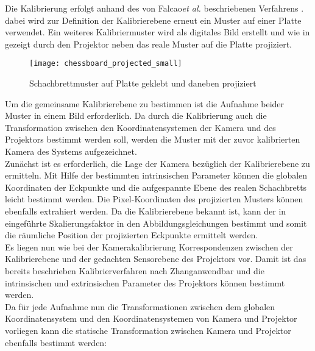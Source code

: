 Die Kalibrierung erfolgt anhand des von Falcao\red[Groß?] \textit{et al.} beschriebenen Verfahrens \cite{Falcao2008}. dabei wird zur Definition der Kalibrierebene erneut ein Muster auf einer Platte verwendet. Ein weiteres Kalibriermuster wird als digitales Bild erstellt und wie in  gezeigt durch den Projektor neben das reale Muster auf die Platte projiziert.

\begin{figure}[ht]
	\begin{center}
		\texttt{[image: chessboard\_projected\_small]}
		\caption{Schachbrettmuster auf Platte geklebt und daneben projiziert}
		\label{fig.projcalib}
	\end{center}
\end{figure}

Um die gemeinsame Kalibrierebene zu bestimmen ist die Aufnahme beider Muster in einem Bild erforderlich. Da durch die Kalibrierung auch die Transformation zwischen den Koordinatensystemen der Kamera und des Projektors bestimmt werden soll, werden die Muster mit der zuvor kalibrierten Kamera des Systems aufgezeichnet.\\
Zunächst ist es erforderlich, die Lage der Kamera bezüglich der Kalibrierebene zu ermitteln. Mit Hilfe der bestimmten intrinsischen Parameter können die globalen Koordinaten der Eckpunkte und die aufgespannte Ebene des realen Schachbretts leicht bestimmt werden. Die Pixel-Koordinaten des projizierten Musters können ebenfalls extrahiert werden. Da die Kalibrierebene bekannt ist, kann der in  eingeführte Skalierungsfaktor in den Abbildungsgleichungen bestimmt und somit die räumliche Position der projizierten Eckpunkte ermittelt werden.\\

Es liegen nun wie bei der Kamerakalibrierung Korrespondenzen zwischen der Kalibrierebene und der gedachten Sensorebene des Projektors vor. Damit ist das bereits beschrieben Kalibrierverfahren nach Zhang\red[Groß?] anwendbar und die intrinsischen und extrinsischen Parameter des Projektors können bestimmt werden.\\
Da für jede Aufnahme nun die Transformationen zwischen dem globalen Koordinatensystem und den Koordinatensystemen von Kamera und Projektor vorliegen kann die statische Transformation zwischen Kamera und Projektor ebenfalls bestimmt werden:

